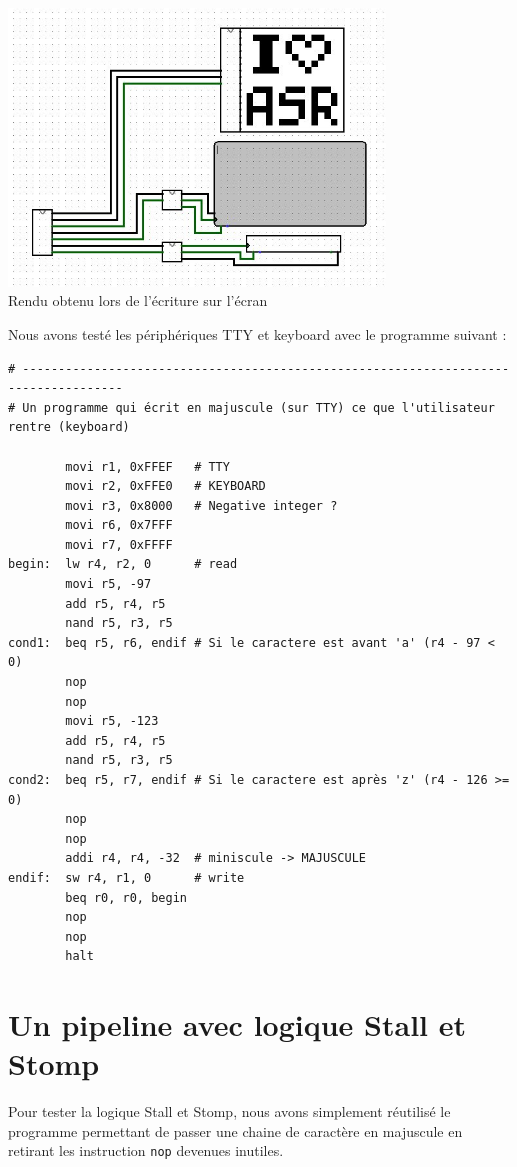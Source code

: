 \documentclass[a4paper]{article}
\begin{document}
  \begin{center}\includegraphics[width=10cm]{screen.jpg} \\ Rendu obtenu lors de l'écriture sur l'écran\end{center}

  Nous avons testé les périphériques TTY et keyboard avec le programme suivant :
\begin{verbatim}
# ------------------------------------------------------------------------------------
# Un programme qui écrit en majuscule (sur TTY) ce que l'utilisateur rentre (keyboard)

        movi r1, 0xFFEF   # TTY
        movi r2, 0xFFE0   # KEYBOARD
        movi r3, 0x8000   # Negative integer ?
        movi r6, 0x7FFF
        movi r7, 0xFFFF
begin:  lw r4, r2, 0      # read
        movi r5, -97
        add r5, r4, r5
        nand r5, r3, r5
cond1:  beq r5, r6, endif # Si le caractere est avant 'a' (r4 - 97 < 0)
        nop
        nop
        movi r5, -123
        add r5, r4, r5
        nand r5, r3, r5
cond2:  beq r5, r7, endif # Si le caractere est après 'z' (r4 - 126 >= 0)
        nop
        nop
        addi r4, r4, -32  # miniscule -> MAJUSCULE
endif:  sw r4, r1, 0      # write
        beq r0, r0, begin
        nop
        nop
        halt
\end{verbatim}

  \section{Un pipeline avec logique Stall et Stomp}
  
  Pour tester la logique Stall et Stomp, nous avons simplement réutilisé le programme permettant de passer une chaine de caractère en majuscule en retirant les instruction \verb|nop| devenues inutiles.
\end{document}
